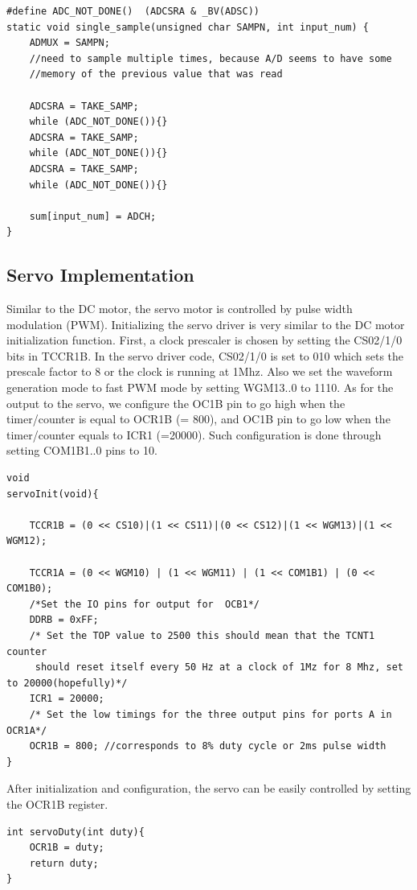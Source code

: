 \begin{lstlisting}[float=ht]
#define ADC_NOT_DONE() 	(ADCSRA & _BV(ADSC)) 
static void single_sample(unsigned char SAMPN, int input_num) {
	ADMUX = SAMPN;
	//need to sample multiple times, because A/D seems to have some
	//memory of the previous value that was read

	ADCSRA = TAKE_SAMP;
	while (ADC_NOT_DONE()){}
	ADCSRA = TAKE_SAMP;
	while (ADC_NOT_DONE()){}
	ADCSRA = TAKE_SAMP;
	while (ADC_NOT_DONE()){}

	sum[input_num] = ADCH;
}
\end{lstlisting}

\subsection{Servo Implementation}
Similar to the DC motor, the servo motor is controlled by pulse width modulation (PWM). Initializing the servo driver is very similar to the DC motor initialization function. First, a clock prescaler is chosen by setting the CS02/1/0 bits in TCCR1B. In the servo driver code, CS02/1/0 is set to 010 which sets the prescale factor to 8 or the clock is running at 1Mhz. Also we set the waveform generation mode to fast PWM mode by setting WGM13..0 to 1110. As for the output to the servo, we configure the OC1B pin to go high when the timer/counter is equal to OCR1B (= 800), and OC1B pin to go low when the timer/counter equals to ICR1 (=20000). Such configuration is done through setting COM1B1..0 pins to 10.

\begin{lstlisting}
void
servoInit(void){

	TCCR1B = (0 << CS10)|(1 << CS11)|(0 << CS12)|(1 << WGM13)|(1 << WGM12);

	TCCR1A = (0 << WGM10) | (1 << WGM11) | (1 << COM1B1) | (0 << COM1B0);
	/*Set the IO pins for output for  OCB1*/
	DDRB = 0xFF;
	/* Set the TOP value to 2500 this should mean that the TCNT1 counter
	 should reset itself every 50 Hz at a clock of 1Mz for 8 Mhz, set to 20000(hopefully)*/
	ICR1 = 20000;
	/* Set the low timings for the three output pins for ports A in OCR1A*/
	OCR1B = 800; //corresponds to 8% duty cycle or 2ms pulse width
}
\end{lstlisting}

After initialization and configuration, the servo can be easily controlled by setting the OCR1B register.

\begin{lstlisting}
int servoDuty(int duty){
	OCR1B = duty;
	return duty;
}
\end{lstlisting}

